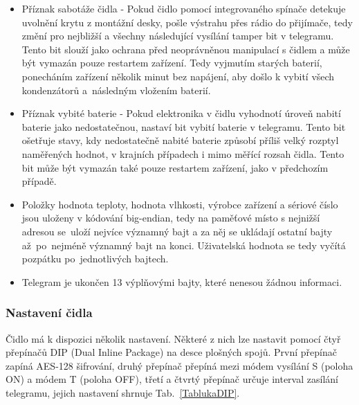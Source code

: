 \begin{itemize}
	\item Příznak sabotáže čidla - Pokud čidlo pomocí integrovaného spínače detekuje uvolnění krytu z montážní desky, pošle výstrahu přes rádio do přijímače, tedy změní pro nejbližší a všechny následující vysílání tamper bit v telegramu. Tento bit slouží jako ochrana před neoprávněnou manipulací s čidlem a může být vymazán pouze restartem zařízení. Tedy vyjmutím starých baterií, ponecháním zařízení několik minut bez napájení, aby došlo k vybití všech kondenzátorů a~následným vložením baterií.
\item Příznak vybité baterie - Pokud elektronika v čidlu vyhodnotí úroveň nabití baterie jako nedostatečnou, nastaví bit vybití baterie v telegramu. Tento bit ošetřuje stavy, kdy nedostatečně nabité baterie způsobí příliš velký rozptyl naměřených hodnot, v krajních případech i mimo měřící rozsah čidla. Tento bit může být vymazán také pouze restartem zařízení, jako v předchozím případě.
\item Položky hodnota teploty, hodnota vlhkosti, výrobce zařízení a sériové číslo jsou uloženy v kódování big-endian, tedy na paměťové místo s nejnižší adresou se~uloží nejvíce významný bajt a za něj se ukládají ostatní bajty až~po~nejméně významný bajt na konci. Uživatelská hodnota se tedy vyčítá pozpátku po~jednotlivých bajtech.
\item Telegram je ukončen 13 výplňovými bajty, které nenesou žádnou informaci.
\end{itemize}


\subsubsection{Nastavení čidla}
Čidlo má k dispozici několik nastavení. Některé z nich lze nastavit pomocí čtyř přepínačů DIP (Dual Inline Package) na desce plošných spojů.
První přepínač zapíná AES-128 šifrování, druhý přepínač přepíná mezi módem vysílání S (poloha ON) a módem T (poloha OFF), třetí a čtvrtý přepínač určuje interval zasílání telegramu, jejich nastavení shrnuje Tab.~\ref{TablukaDIP}.


